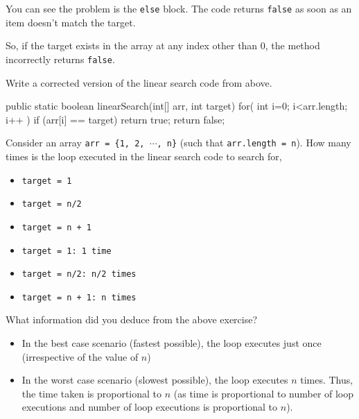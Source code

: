 You can see the problem is the \texttt{else} block. The code returns \texttt{false} as soon as an item doesn't match the target. 

So, if the target exists in the array at any index other than 0, the method incorrectly returns \texttt{false}.

\begin{exercise}
Write a corrected version of the linear search code from above.
\end{exercise}
\begin{codeAnswer}
public static boolean linearSearch(int[] arr, int target) {
   for( int i=0; i<arr.length; i++ ) {
      if (arr[i] == target) {
         return true;
      }
   }
   return false;
}	
\end{codeAnswer}

\begin{exercise}
Consider an array \texttt{arr = \{1, 2, $\cdots$, n\}} (such that \texttt{arr.length = n}). How many times is the loop executed in the linear search code to search for,

\begin{itemize}
\item \texttt{target = 1}	
\item \texttt{target = n/2}	
\item \texttt{target = n + 1}	
\end{itemize}
\end{exercise}
\begin{answer}
\begin{itemize}
\item \texttt{target = 1: 1 time}
\item \texttt{target = n/2: n/2 times}
\item \texttt{target = n + 1: n times}
\end{itemize}
\end{answer}

What information did you deduce from the above exercise? 

\begin{itemize}
\item In the best case scenario (fastest possible), the loop executes just once (irrespective of the value of $n$)
\item In the worst case scenario (slowest possible), the loop executes $n$ times. Thus, the time taken is proportional to $n$ (as time is proportional to number of loop executions and number of loop executions is proportional to $n$).
\end{itemize}


